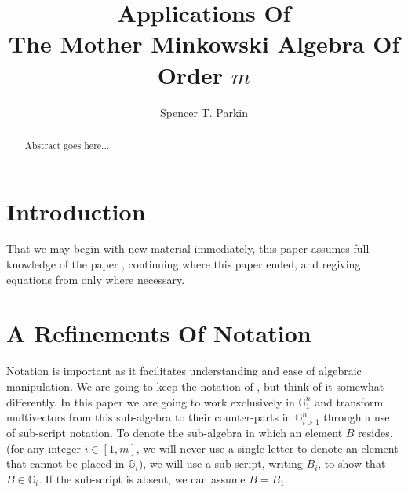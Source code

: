 \documentclass{birkjour}
\theoremstyle{definition}
\theoremstyle{remark}
\numberwithin{equation}{section}
\newcommand{\G}{\mathbb{G}}
\begin{document}
%
%
%
%
%
%
%
%

\title{Applications Of\\The Mother Minkowski Algebra Of Order $m$}

\author{Spencer T. Parkin}
\address{102 W. 500 S., Salt Lake City, UT  84101}




\begin{abstract}
Abstract goes here...
\end{abstract}

\maketitle

\section{Introduction}

That we may begin with new material immediately, this paper assumes full knowledge
of the paper \cite{}, continuing where this paper ended, and regiving equations from
\cite{} only where necessary.

\section{A Refinements Of Notation}

Notation is important as it facilitates understanding and ease of algebraic manipulation.
We are going to keep the notation of \cite{}, but think of it somewhat differently.
In this paper we are going to work exclusively in $\G_1^n$ and transform multivectors
from this sub-algebra to their counter-parts in $\G_{i>1}^n$ through a use of sub-script notation.
To denote the sub-algebra in which an element $B$ resides, (for any integer $i\in[1,m]$,
we will never use a single letter to denote an element that cannot be placed in $\G_i$),
we will use a sub-script, writing $B_i$, to show that $B\in\G_i$.  If the sub-script is
absent, we can assume $B=B_1$.
\end{document}
